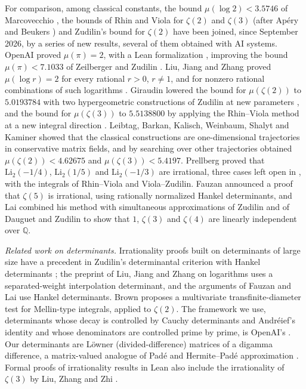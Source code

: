 \documentclass[11pt]{amsart}
\theoremstyle{definition}
\theoremstyle{remark}
\numberwithin{equation}{section}
\newcommand{\Q}{\mathbb Q}
\begin{document}
For comparison, among classical constants, the bound $\mu(\log2)<3.5746$ of Marcovecchio \cite{Marcovecchio09},
the bounds of Rhin and Viola for $\zeta(2)$ and $\zeta(3)$ \cite{RhinViola96,RhinViola01} (after Ap\'ery and Beukers
\cite{Apery79,Beukers79}) and Zudilin's bound for $\zeta(2)$ \cite{Zudilin14} have been joined, since September 2026, by a
series of new results, several of them
obtained with AI systems. OpenAI proved $\mu(\pi)=2$, with a Lean formalization \cite{OpenAIPi2026}, improving
the bound $\mu(\pi)<7.1033$ of Zeilberger and Zudilin \cite{ZeilbergerZudilin20}. Liu, Jiang and Zhang proved $\mu(\log r)=2$ for
every rational $r>0$, $r\ne1$, and for nonzero rational combinations of such logarithms \cite{LiuJiangZhang26}. Giraudin
lowered the bound for $\mu(\zeta(2))$ to $5.0193784$ with two hypergeometric constructions of Zudilin \cite{Zudilin14} at
new parameters \cite{Giraudin26}, and the bound for $\mu(\zeta(3))$ to $5.5138800$ by applying the Rhin--Viola method at a
new integral direction \cite{Giraudin26z3}. Leibtag, Barkan, Kalisch, Weinbaum, Shalyt and Kaminer
\cite{LBKWSK26} showed that the classical constructions are one-dimensional trajectories in conservative matrix
fields, and by searching over other trajectories obtained $\mu(\zeta(2))<4.62675$ and $\mu(\zeta(3))<5.4197$. Prellberg
\cite{Prellberg26} proved that $\mathrm{Li}_2(-1/4)$, $\mathrm{Li}_2(1/5)$ and $\mathrm{Li}_2(-1/3)$ are irrational, three
cases left open in \cite{CDT2024}, with the integrals of Rhin--Viola and Viola--Zudilin. Fauzan \cite{Fauzan2026} announced a proof that
$\zeta(5)$ is irrational, using rationally normalized Hankel determinants, and Lai
\cite{Lai2026} combined his method with simultaneous approximations of Zudilin and of Dauguet and Zudilin to show that
$1$, $\zeta(3)$ and $\zeta(4)$ are linearly independent over $\Q$.

\emph{Related work on determinants.} Irrationality proofs built on determinants of large size have a precedent
in Zudilin's determinantal criterion with Hankel determinants \cite{Zudilin}; the preprint of Liu, Jiang
and Zhang on logarithms \cite{LiuJiangZhang26} uses a separated-weight interpolation determinant, and the arguments of
Fauzan and Lai \cite{Fauzan2026,Lai2026} use Hankel determinants. Brown \cite{Brown26} proposes a multivariate
transfinite-diameter test for Mellin-type integrals, applied to $\zeta(2)$. The framework
we use, determinants whose decay is controlled by Cauchy determinants and Andr\'eief's identity and whose
denominators are controlled prime by prime, is OpenAI's \cite{OpenAI2026}. Our determinants are L\"owner
(divided-difference) matrices of a digamma difference, a matrix-valued analogue of Pad\'e and Hermite--Pad\'e
approximation \cite{NikishinSorokin91}. Formal proofs of irrationality results in Lean also include the
irrationality of $\zeta(3)$ by Liu, Zhang and Zhi \cite{LZZ25}.
\end{document}
